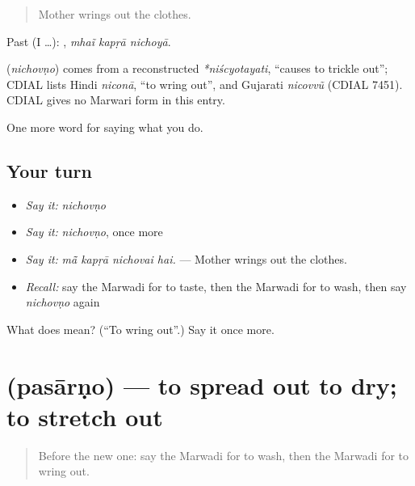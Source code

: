 \begin{quote}
Mother wrings out the clothes.
\end{quote}

Past (I …):   , \emph{mhaĩ kapṛā nichoyā}.

\begin{cousinweb}
\textbf{} (\emph{nichovṇo}) comes from a reconstructed \emph{*niścyotayati}, \textquotedblleft{}causes to trickle out\textquotedblright{}; CDIAL lists Hindi \emph{niconā}, \textquotedblleft{}to wring out\textquotedblright{}, and Gujarati \emph{nicovvũ} (CDIAL 7451). CDIAL gives no Marwari form in this entry.
\end{cousinweb}

\begin{grammarlens}[title={What you've built}]
One more word for saying what you do.
\end{grammarlens}

\subsection*{Your turn}
\begin{itemize}
\raggedright
  \item \emph{Say it:} \emph{nichovṇo}
  \item \emph{Say it:} \emph{nichovṇo}, once more
  \item \emph{Say it:} \emph{mā̃ kapṛā nichovai hai.} — Mother wrings out the clothes.
  \item \emph{Recall:} say the Marwadi for to taste, then the Marwadi for to wash, then say \emph{nichovṇo} again
\end{itemize}

\begin{tcolorbox}[breakable,colback=teal!4,colframe=teal!35!black,title={Before you move on}]
What does  mean? (\textquotedblleft{}To wring out\textquotedblright{}.) Say it once more.
\end{tcolorbox}
\section[\texorpdfstring{\mw{पसारणो} (pasārṇo)}{पसारणो (pasārṇo)}]{ (pasārṇo) — to spread out to dry; to stretch out}

\label{lesson:MW-C170-pasarno}



\begin{quote}
Before the new one: say the Marwadi for to wash, then the Marwadi for to wring out.
\end{quote}

